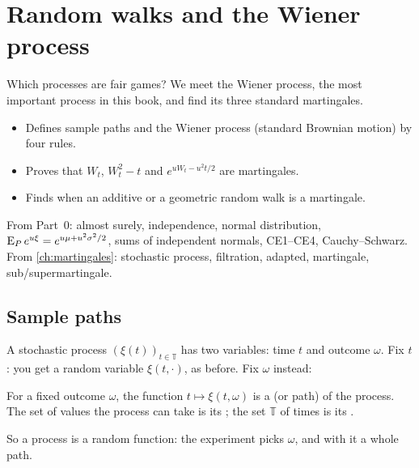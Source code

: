 \chapter{Random walks and the Wiener process}
\label{ch:first-mg}

\begin{question}
Which processes are fair games? We meet the Wiener process, the most important process in this book, and find its three standard martingales.
\end{question}

\begin{whatfor}
\begin{itemize}
  \item Defines sample paths and the Wiener process (standard Brownian motion) by four rules.
  \item Proves that $W_t$, $W_t^2-t$ and $e^{uW_t-u^2t/2}$ are martingales.
  \item Finds when an additive or a geometric random walk is a martingale.
\end{itemize}
\end{whatfor}

\begin{prereq}
From Part~0: almost surely, independence, normal distribution, $\operatorname{E}_Pe^{u\xi}=e^{u\mu+u^2\sigma^2/2}$, sums of independent normals, CE1--CE4, Cauchy--Schwarz. From \cref{ch:martingales}: stochastic process, filtration, adapted, martingale, sub/supermartingale.
\end{prereq}

\section{Sample paths}

A stochastic process $(\xi(t))_{t\in\mathbb T}$ has two variables: time $t$ and outcome $\omega$. Fix $t$: you get a random variable $\xi(t,\cdot)$, as before. Fix $\omega$ instead:

\begin{definition}
For a fixed outcome $\omega$, the function $t\mapsto\xi(t,\omega)$ is a  (or path) of the process. The set of values the process can take is its ; the set $\mathbb T$ of times is its .
\end{definition}

So a process is a random function: the experiment picks $\omega$, and with it a whole path.

